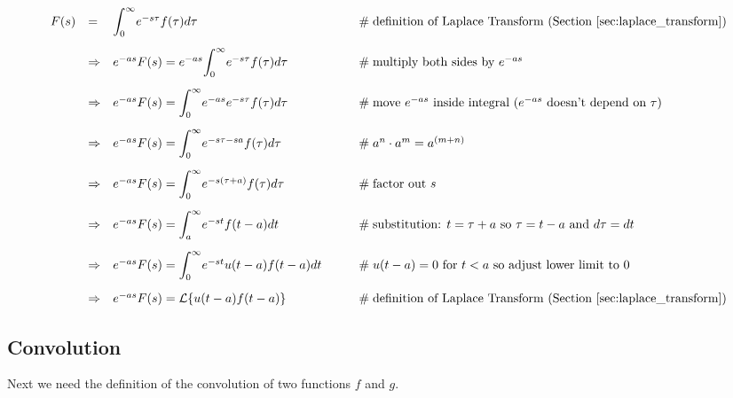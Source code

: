 \documentclass{article}
\theoremstyle{definition}
\begin{document}
\begin{equation*}
\begin{array}{lllll}
F(s)
&=& \mathlarger{\int}_0^\infty e^{-s\tau} f(\tau) d\tau                                                       &\qquad \mathrel{\#} \text{definition of Laplace Transform (Section \ref{sec:laplace_transform})}    \\
[15pt]
&\Rightarrow& e^{-as} F(s) = e^{-as} \mathlarger{\int}_0^\infty e^{-s\tau} f(\tau) d\tau    &\qquad \mathrel{\#} \text{multiply both sides by $e^{-as}$}                                                              \\
[15pt]
&\Rightarrow& e^{-as} F(s) = \mathlarger{\int}_0^\infty e^{-as} e^{-s\tau} f(\tau) d\tau    &\qquad \mathrel{\#} \text{move $e^{-as}$ inside integral ($e^{-as}$ doesn't depend on $\tau$)}    \\
[15pt]
&\Rightarrow& e^{-as} F(s) = \mathlarger{\int}_0^\infty e^{-s\tau - sa} f(\tau) d\tau         &\qquad \mathrel{\#} a^n \cdot a^m = a^{(m+n)}                                                                                 \\
[15pt]
&\Rightarrow& e^{-as} F(s) = \mathlarger{\int}_0^\infty e^{-s(\tau+a)} f(\tau) d\tau         &\qquad \mathrel{\#} \text{factor out $s$}                                                                                            \\
[15pt]
&\Rightarrow& e^{-as} F(s) = \mathlarger{\int}_a^\infty e^{-st} f(t-a) dt                           &\qquad \mathrel{\#} \text{substitution: $t = \tau + a$ so $\tau = t - a$ and $d\tau = dt$}                   \\
[15pt]
&\Rightarrow& e^{-as} F(s) = \mathlarger{\int}_0^\infty e^{-st} u(t-a) f(t-a) dt                 &\qquad \mathrel{\#} \text{$u(t-a) = 0$ for $t < a$ so adjust lower limit to 0}                                       \\
[15pt]
&\Rightarrow& e^{-as} F(s) = \mathcal{L}\{u(t-a) f(t-a)\}                                                 &\qquad \mathrel{\#} \text{definition of Laplace Transform (Section \ref{sec:laplace_transform})}       \\
\end{array}
\end{equation*}


\bigskip
\subsection{Convolution}
\label{sec:convolution}
Next we need the definition of the convolution of two functions $f$ and $g$.
\end{document}
